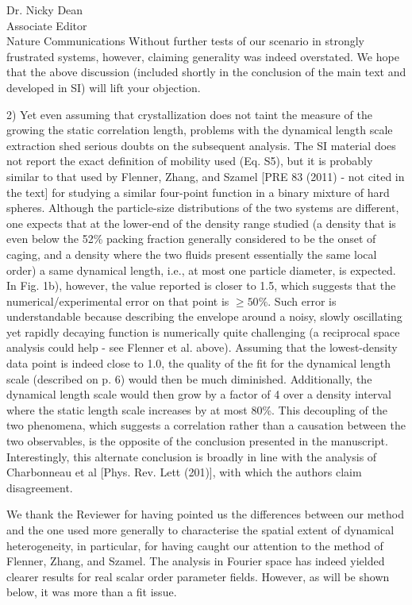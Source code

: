 \documentclass[a4paper, rebuttal, parskip=true, firsthead=false, fromemail=true, foldmarks=false]{scrlttr2}
\begin{document}
\begin{letter}{Dr. Nicky Dean\\
Associate Editor\\
Nature Communications}
Without further tests of our scenario in strongly frustrated systems, however, claiming generality was indeed overstated. We hope that the above discussion (included shortly in the conclusion of the main text and developed in SI) will lift your objection.


\begin{quotationi}
2) Yet even assuming that crystallization does not taint the measure of the growing the static correlation length, problems with the dynamical length scale extraction shed serious doubts on the subsequent analysis. The SI material does not report the exact definition of mobility used (Eq. S5), but it is probably similar to that used by Flenner, Zhang, and Szamel [PRE 83 (2011) - not cited in the text] for studying a similar four-point function in a binary mixture of hard spheres. Although the particle-size distributions of the two systems are different, one expects that at the lower-end of the density range studied (a density that is even below the 52\% packing fraction generally considered to be the onset of caging, and a density where the two fluids present essentially the same local order) a same dynamical length, i.e., at most one particle diameter, is expected. In Fig. 1b), however, the value reported is closer to 1.5, which suggests that the numerical/experimental error on that point is $\geq 50\%$. Such error is understandable because describing the envelope around a noisy, slowly oscillating yet rapidly decaying function is numerically quite challenging (a reciprocal space analysis could help - see Flenner et al. above). Assuming that the lowest-density data point is indeed close to 1.0, the quality of the fit for the dynamical length scale (described on p. 6) would then be much diminished. Additionally, the dynamical length scale would then grow by a factor of 4 over a density interval where the static length scale increases by at most 80\%. This decoupling of the two phenomena, which suggests a correlation rather than a causation between the two observables, is the opposite of the conclusion presented in the manuscript. Interestingly, this alternate conclusion is broadly in line with the analysis of Charbonneau et al [Phys. Rev. Lett (201)], with which the authors claim disagreement.
\end{quotationi}

We thank the Reviewer for having pointed us the differences between our method and the one used more generally to characterise the spatial extent of dynamical heterogeneity, in particular, for having caught our attention to the method of Flenner, Zhang, and Szamel. The analysis in Fourier space has indeed yielded clearer results for real scalar order parameter fields. However, as will be shown below, it was more than a fit issue. 


\end{letter}
\end{document}
